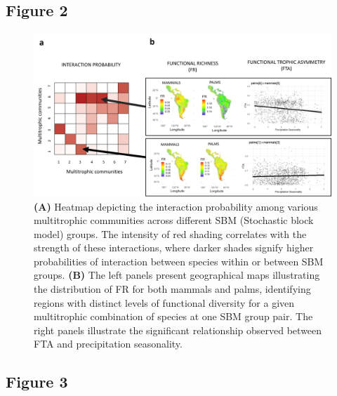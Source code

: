 \documentclass[
]{agujournal2019}
\begin{document}
\subsection{Figure 2}\label{figure-2}

\begin{figure}[H]

{\centering \includegraphics{Main_figures/00_network_fr.png}

}

\caption{\textbf{(A)} Heatmap depicting the interaction probability
among various multitrophic communities across different SBM (Stochastic
block model) groups. The intensity of red shading correlates with the
strength of these interactions, where darker shades signify higher
probabilities of interaction between species within or between SBM
groups. \textbf{(B)} The left panels present geographical maps
illustrating the distribution of FR for both mammals and palms,
identifying regions with distinct levels of functional diversity for a
given multitrophic combination of species at one SBM group pair. The
right panels illustrate the significant relationship observed between
FTA and precipitation seasonality.}

\end{figure}%

\subsection{Figure 3}\label{figure-3}
\end{document}
